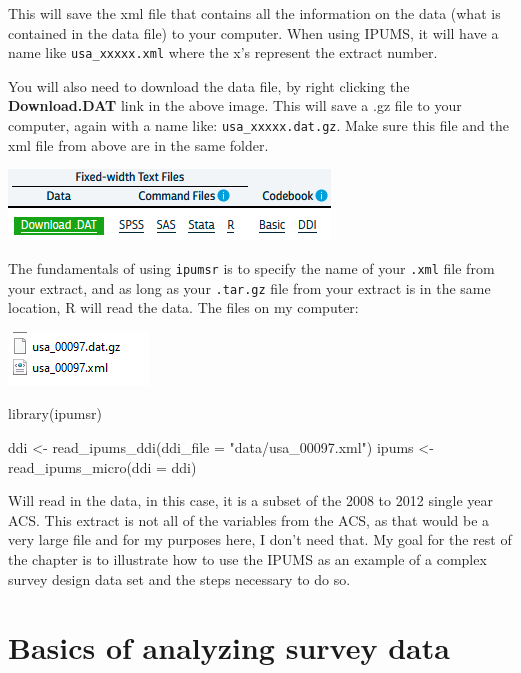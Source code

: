 \documentclass[
  letterpaper,
  DIV=11,
  numbers=noendperiod]{scrreprt}
\newenvironment{Shaded}{\begin{snugshade}}{\end{snugshade}}
\newcommand{\AttributeTok}[1]{\textcolor[rgb]{0.40,0.45,0.13}{#1}}
\newcommand{\FunctionTok}[1]{\textcolor[rgb]{0.28,0.35,0.67}{#1}}
\newcommand{\NormalTok}[1]{\textcolor[rgb]{0.00,0.23,0.31}{#1}}
\newcommand{\OtherTok}[1]{\textcolor[rgb]{0.00,0.23,0.31}{#1}}
\newcommand{\StringTok}[1]{\textcolor[rgb]{0.13,0.47,0.30}{#1}}
\begin{document}
This will save the xml file that contains all the information on the
data (what is contained in the data file) to your computer. When using
IPUMS, it will have a name like \texttt{usa\_xxxxx.xml} where the x's
represent the extract number.

You will also need to download the data file, by right clicking the
\textbf{Download.DAT} link in the above image. This will save a .gz file
to your computer, again with a name like: \texttt{usa\_xxxxx.dat.gz}.
Make sure this file and the xml file from above are in the same folder.

\includegraphics{images/impum1.png}

The fundamentals of using \texttt{ipumsr} is to specify the name of your
\texttt{.xml} file from your extract, and as long as your
\texttt{.tar.gz} file from your extract is in the same location, R will
read the data. The files on my computer:

\includegraphics{images/ipums_files.png}

\begin{Shaded}
\begin{Highlighting}[]
\FunctionTok{library}\NormalTok{(ipumsr)}

\NormalTok{ddi }\OtherTok{\textless{}{-}} \FunctionTok{read\_ipums\_ddi}\NormalTok{(}\AttributeTok{ddi\_file =} \StringTok{"data/usa\_00097.xml"}\NormalTok{)}
\NormalTok{ipums }\OtherTok{\textless{}{-}} \FunctionTok{read\_ipums\_micro}\NormalTok{(}\AttributeTok{ddi =}\NormalTok{ ddi)}
\end{Highlighting}
\end{Shaded}

Will read in the data, in this case, it is a subset of the 2008 to 2012
single year ACS. This extract is not all of the variables from the ACS,
as that would be a very large file and for my purposes here, I don't
need that. My goal for the rest of the chapter is to illustrate how to
use the IPUMS as an example of a complex survey design data set and the
steps necessary to do so.

\hypertarget{basics-of-analyzing-survey-data}{%
\section{Basics of analyzing survey
data}\label{basics-of-analyzing-survey-data}}
\end{document}
